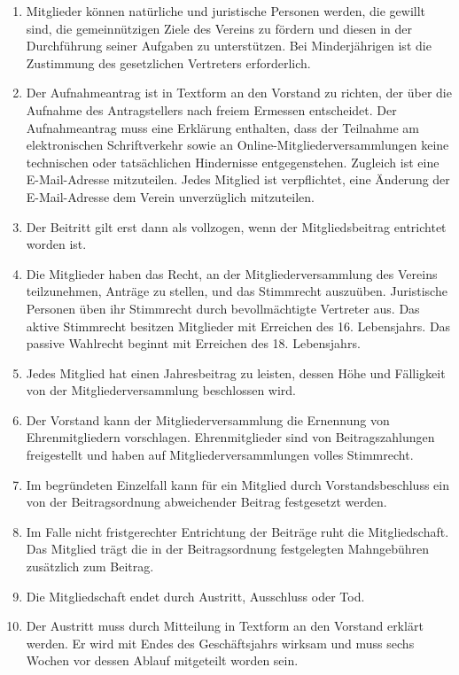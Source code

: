 \documentclass[12pt,a4paper]{article}
\begin{document}
\begin{enumerate}
\item Mitglieder können natürliche und juristische Personen werden, die gewillt sind, die gemeinnützigen Ziele des Vereins zu fördern und diesen in der Durchführung seiner Aufgaben zu unterstützen. Bei Minderjährigen ist die Zustimmung des gesetzlichen Vertreters erforderlich.
\item Der Aufnahmeantrag ist in Textform an den Vorstand zu richten, der über die Aufnahme des Antragstellers nach freiem Ermessen entscheidet. Der Aufnahmeantrag muss eine Erklärung enthalten, dass der Teilnahme am elektronischen Schriftverkehr sowie an Online-Mitgliederversammlungen keine technischen oder tatsächlichen Hindernisse entgegenstehen. Zugleich ist eine E-Mail-Adresse mitzuteilen. Jedes Mitglied ist verpflichtet, eine Änderung der E-Mail-Adresse dem Verein unverzüglich mitzuteilen.
\item Der Beitritt gilt erst dann als vollzogen, wenn der Mitgliedsbeitrag entrichtet worden ist.
\item Die Mitglieder haben das Recht, an der Mitgliederversammlung des Vereins teilzunehmen, Anträge zu stellen, und das Stimmrecht auszuüben. Juristische Personen üben ihr Stimmrecht durch bevollmächtigte Vertreter aus. Das aktive Stimmrecht besitzen Mitglieder mit Erreichen des 16. Lebensjahrs. Das passive Wahlrecht beginnt mit Erreichen des 18. Lebensjahrs.
\item Jedes Mitglied hat einen Jahresbeitrag zu leisten, dessen Höhe und Fälligkeit von der Mitgliederversammlung beschlossen wird.
\item Der Vorstand kann der Mitgliederversammlung die Ernennung von Ehrenmitgliedern vorschlagen. Ehrenmitglieder sind von Beitragszahlungen freigestellt und haben auf Mitgliederversammlungen volles Stimmrecht.
\item Im begründeten Einzelfall kann für ein Mitglied durch Vorstandsbeschluss ein von der Beitragsordnung abweichender Beitrag festgesetzt werden.
\item Im Falle nicht fristgerechter Entrichtung der Beiträge ruht die Mitgliedschaft. Das Mitglied trägt die in der Beitragsordnung festgelegten Mahngebühren zusätzlich zum Beitrag.
\item Die Mitgliedschaft endet durch Austritt, Ausschluss oder Tod.
\item Der Austritt muss durch Mitteilung in Textform an den Vorstand erklärt werden. Er wird mit Endes des Geschäftsjahrs wirksam und muss sechs Wochen vor dessen Ablauf mitgeteilt worden sein.

\end{enumerate}
\end{document}
